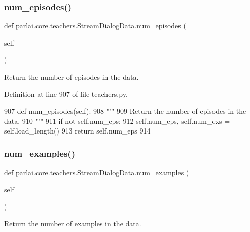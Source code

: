 \subsubsection{\texorpdfstring{num\+\_\+episodes()}{num\_episodes()}}
{\footnotesize\ttfamily def parlai.\+core.\+teachers.\+Stream\+Dialog\+Data.\+num\+\_\+episodes (\begin{DoxyParamCaption}\item[{}]{self }\end{DoxyParamCaption})}

\begin{DoxyVerb}Return the number of episodes in the data.
\end{DoxyVerb}
 

Definition at line 907 of file teachers.\+py.


\begin{DoxyCode}
907     \textcolor{keyword}{def }num\_episodes(self):
908         \textcolor{stringliteral}{"""}
909 \textcolor{stringliteral}{        Return the number of episodes in the data.}
910 \textcolor{stringliteral}{        """}
911         \textcolor{keywordflow}{if} \textcolor{keywordflow}{not} self.num\_eps:
912             self.num\_eps, self.num\_exs = self.load\_length()
913         \textcolor{keywordflow}{return} self.num\_eps
914 
\end{DoxyCode}
\mbox{\label{classparlai_1_1core_1_1teachers_1_1StreamDialogData_ada385b7a8f549f4d65eb910b668c77e5}} 
\subsubsection{\texorpdfstring{num\+\_\+examples()}{num\_examples()}}
{\footnotesize\ttfamily def parlai.\+core.\+teachers.\+Stream\+Dialog\+Data.\+num\+\_\+examples (\begin{DoxyParamCaption}\item[{}]{self }\end{DoxyParamCaption})}

\begin{DoxyVerb}Return the number of examples in the data.
\end{DoxyVerb}
 

